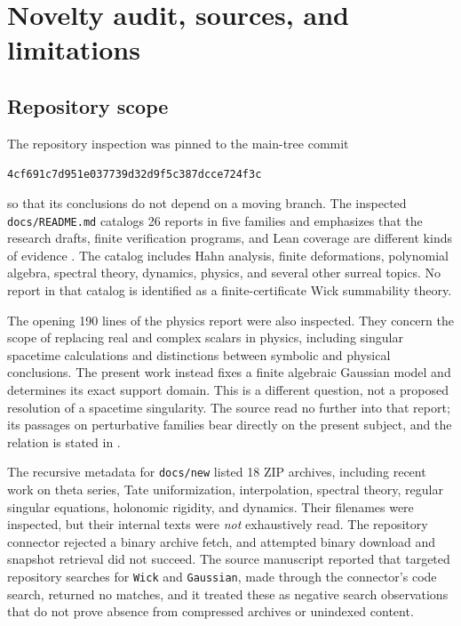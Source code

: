 \documentclass[11pt,letterpaper]{article}
\numberwithin{equation}{section}
\theoremstyle{definition}
\theoremstyle{remark}
\newcommand{\Commit}{\nolinkurl{4cf691c7d951e037739d32d9f5c387dcce724f3c}}
\begin{document}
\section{Novelty audit, sources, and limitations}
\label{wick:sec:provenance}

\subsection{Repository scope}
\label{wick:sub:reposcope}

The repository inspection was pinned to the main-tree commit
\begin{center}\small\Commit\end{center}
so that its conclusions do not depend on a moving branch. The inspected
\texttt{docs/README.md} catalogs 26 reports in five families and emphasizes
that the research drafts, finite verification programs, and Lean coverage
are different kinds of evidence \cite{Repo}. The catalog includes Hahn
analysis, finite deformations, polynomial algebra, spectral theory, dynamics,
physics, and several other surreal topics. No report in that catalog is
identified as a finite-certificate Wick summability theory.

The opening 190 lines of the physics report were also inspected. They
concern the scope of replacing real and complex scalars in physics,
including singular spacetime calculations and distinctions between symbolic
and physical conclusions. The present work instead fixes a finite algebraic
Gaussian model and determines its exact support domain. This is a different
question, not a proposed resolution of a spacetime singularity. The source
read no further into that report; its passages on perturbative families
bear directly on the present subject, and the relation is stated in
.

The recursive metadata for \texttt{docs/new} listed 18 ZIP archives,
including recent work on theta series, Tate uniformization, interpolation,
spectral theory, regular singular equations, holonomic rigidity, and
dynamics. Their filenames were inspected, but their internal texts were
\emph{not} exhaustively read. The repository connector rejected a binary
archive fetch, and attempted binary download and snapshot retrieval did not
succeed. The source manuscript reported that targeted repository searches
for \texttt{Wick} and \texttt{Gaussian}, made through the connector's code
search, returned no matches, and it treated these as negative search
observations that do not prove absence from compressed archives or
unindexed content.
\end{document}
